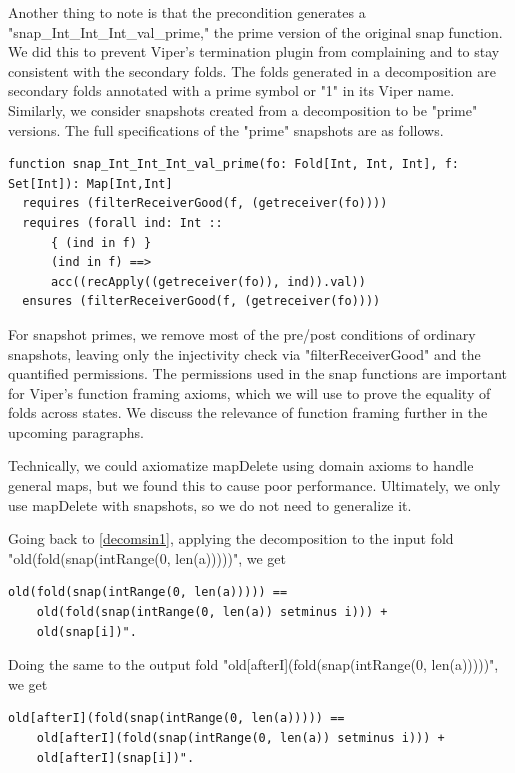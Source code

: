 \documentclass[msc,oneside]{ubcthesis}
\theoremstyle{definition}
\begin{document}
Another thing to note is that the precondition generates a \\ "snap_Int_Int_Int_val_prime," the prime version of the original snap function. We did this to prevent Viper's termination plugin from complaining and to stay consistent with the secondary folds. The folds generated in a decomposition are secondary folds annotated with a prime symbol or "1" in its Viper name. Similarly, we consider snapshots created from a decomposition to be "prime" versions. The full specifications of the "prime" snapshots are as follows.
\begin{lstlisting}[label=snapPrime,caption=Encoding of Snapshot Prime]
function snap_Int_Int_Int_val_prime(fo: Fold[Int, Int, Int], f: Set[Int]): Map[Int,Int]
  requires (filterReceiverGood(f, (getreceiver(fo))))
  requires (forall ind: Int ::
      { (ind in f) }
      (ind in f) ==>
      acc((recApply((getreceiver(fo)), ind)).val))
  ensures (filterReceiverGood(f, (getreceiver(fo))))
\end{lstlisting}
For snapshot primes, we remove most of the pre/post conditions of ordinary snapshots, leaving only the injectivity check via "filterReceiverGood" and the quantified permissions. The permissions used in the snap functions are important for Viper's function framing axioms, which we will use to prove the equality of folds across states. We discuss the relevance of function framing further in the upcoming paragraphs.

Technically, we could axiomatize mapDelete using domain axioms to handle general maps, but we found this to cause poor performance. Ultimately, we only use mapDelete with snapshots, so we do not need to generalize it. 

Going back to \cref{decomsin1}, applying the decomposition to the input fold "old(fold(snap(intRange(0, len(a)))))", we get
\begin{lstlisting}[label=singletoniIn,caption=Decomposition of Input Fold to Reassignment at index i]
    old(fold(snap(intRange(0, len(a))))) == 
    old(fold(snap(intRange(0, len(a)) setminus i))) +
    old(snap[i])".
\end{lstlisting}

Doing the same to the output fold "old[afterI](fold(snap(intRange(0, len(a)))))", we get
\begin{lstlisting}[label=singletoniOut,caption=Decomposition of Output Fold to Reassignment at index i]
    old[afterI](fold(snap(intRange(0, len(a))))) == 
    old[afterI](fold(snap(intRange(0, len(a)) setminus i))) +
    old[afterI](snap[i])".
\end{lstlisting}
\end{document}
